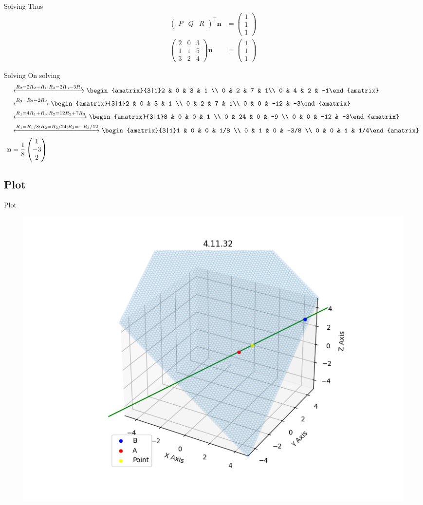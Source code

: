\documentclass{beamer}
\theoremstyle{remark}
\newcommand{\myvec}[1]{\ensuremath{\begin{pmatrix}#1\end{pmatrix}}}
\newcommand{\augvec}[3]{\ensuremath{\begin{amatrix}{#1|#2}#3\end{amatrix}}}
\let\vec\mathbf
\numberwithin{equation}{section}
\begin{document}
\begin{frame}{Solving}
Thus
\begin{align}
 \myvec{P & Q & R}^\top\vec{n} &= \myvec{1\\1\\1} \\
  \myvec{2 & 0 & 3 \\ 1 & 1 & 5 \\ 3 & 2 & 4}\vec{n} &= \myvec{1\\1\\1}
\end{align}
\end{frame}
\begin{frame}{Solving}
On solving
\begin{align}
&\xleftrightarrow[]{R_2 = 2R_2-R_1; R_3 = 2R_3-3R_1} \augvec{3}{1}{2 & 0 & 3 & 1 \\ 0 & 2 & 7 & 1\\ 0 & 4 & 2 & -1} \\ &\xleftrightarrow[]{R_3=R_3-2R_2}
  \augvec{3}{1}{2 & 0 & 3 & 1 \\ 0 & 2 & 7 & 1\\ 0 & 0 & -12 & -3} \\ &\xleftrightarrow[]{R_1=4R_1+R_3; R_2= 12R_2+7R_3}
  \augvec{3}{1}{8 & 0 & 0 & 1 \\ 0 & 24 & 0 & -9 \\ 0 & 0 & -12 & -3} \\ &\xleftrightarrow[]{R_1 = R_1/8; R_2 = R_2/24; R_3 = -R_3/12}
  \augvec{3}{1}{1 & 0 & 0 & 1/8 \\ 0 & 1 & 0 & -3/8 \\ 0 & 0 & 1 & 1/4} \\
  \vec{n} &= \frac{1}{8}\myvec{1\\-3\\2}
\end{align}
\end{frame}

\subsection{Plot}
\begin{frame}{Plot}
 \begin{figure}[H]
    \centering
    \includegraphics[width=0.8\columnwidth]{../figs/plot.png}
    \caption*{}
    \label{fig:plot}
\end{figure}
\end{frame}
\end{document}

